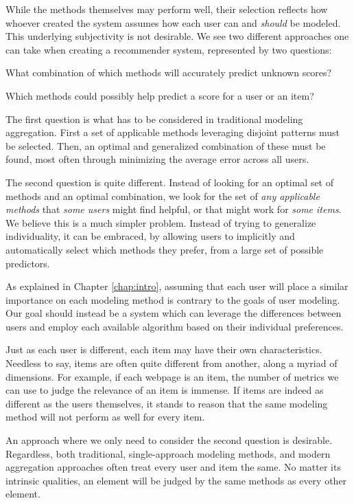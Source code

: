 While the methods themselves may perform well, their selection
reflects how whoever created the system assumes how each user
can and \emph{should} be modeled. This underlying subjectivity is not desirable.
We see two different approaches one can take when creating a recommender system,
represented by two questions:

\clearpage

\begin{enumerate*}
  \item What combination of which methods will accurately predict unknown scores?
  \item Which methods could possibly help predict a score for a user or an item?
\end{enumerate*}

The first question is what has to be considered in traditional modeling aggregation.
First a set of applicable methods leveraging disjoint patterns must be selected. 
Then, an optimal and generalized combination of these must be found,
most often through minimizing the average error across all users.

The second question is quite different. 
Instead of looking for an optimal set of methods and an optimal combination,
we look for the set of \emph{any applicable methods} that \emph{some users} might find helpful,
or that might work for \emph{some items}.
We believe this is a much simpler problem. 
Instead of trying to generalize individuality,
it can be embraced, by allowing users to implicitly and automatically select which methods they prefer,
from a large set of possible predictors.

As explained in Chapter \ref{chap:intro}, 
assuming that each user will place a similar importance on each modeling method is 
contrary to the goals of user modeling. 
Our goal should instead be a system which can leverage the differences
between users and employ each available algorithm based on their individual preferences.

Just as each user is different, each item may have their own characteristics.
Needless to say, items are often quite different from another,
along a myriad of dimensions. For example,
if each webpage is an item, the number of metrics we can use to judge
the relevance of an item is immense.
If items are indeed as different as the users themselves, it stands to reason that the same 
modeling method will not perform as well for every item.

An approach where we only need to consider the second question is desirable.
Regardless, both traditional, single-approach modeling methods, and modern aggregation approaches
often treat every user and item the same. No matter its intrinsic qualities, an element will be judged
by the same methods as every other element. 

